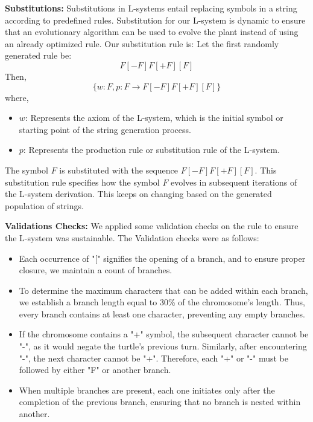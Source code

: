 \vspace*{3mm}
\noindent\textbf{Substitutions:} Substitutions in L-systems entail replacing symbols in a string according to predefined rules. Substitution for our L-system is dynamic to ensure that an evolutionary algorithm can be used to evolve the plant instead of using an already optimized rule. Our substitution rule is:
Let the first randomly generated rule be: \[F[-F]F[+F][F]\] 
Then,
\[
\{w: F, p: F \rightarrow F[-F]F[+F][F]\}
\]
where,
\begin{itemize}
    \item $w$: Represents the axiom of the L-system, which is the initial symbol or starting point of the string generation process. 
    \item $p$: Represents the production rule or substitution rule of the L-system. 
\end{itemize}
The symbol $F$ is substituted with the sequence $F[-F]F[+F][F]$. This substitution rule specifies how the symbol $F$ evolves in subsequent iterations of the L-system derivation. This keeps on changing based on the generated population of strings.

\vspace*{3mm}
\noindent\textbf{Validations Checks:}
We applied some validation checks on the rule to ensure the L-system was sustainable. The Validation checks were as follows:
\begin{itemize}
\item Each occurrence of "[" signifies the opening of a branch, and to ensure proper closure, we maintain a count of branches.
\item To determine the maximum characters that can be added within each branch, we establish a branch length equal to 30\% of the chromosome's length. Thus, every branch contains at least one character, preventing any empty branches.
\item If the chromosome contains a "+" symbol, the subsequent character cannot be "-", as it would negate the turtle's previous turn. Similarly, after encountering "-", the next character cannot be "+". Therefore, each "+" or "-" must be followed by either "F" or another branch.
\item When multiple branches are present, each one initiates only after the completion of the previous branch, ensuring that no branch is nested within another.
\end{itemize}




